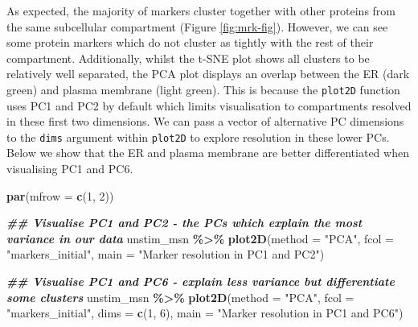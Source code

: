 \documentclass[9pt,a4paper,]{extarticle}
\newenvironment{Shaded}{\begin{snugshade}}{\end{snugshade}}
\newcommand{\AttributeTok}[1]{\textcolor[rgb]{0.13,0.29,0.53}{#1}}
\newcommand{\DecValTok}[1]{\textcolor[rgb]{0.00,0.00,0.81}{#1}}
\newcommand{\DocumentationTok}[1]{\textcolor[rgb]{0.56,0.35,0.01}{\textbf{\textit{#1}}}}
\newcommand{\FunctionTok}[1]{\textcolor[rgb]{0.13,0.29,0.53}{\textbf{#1}}}
\newcommand{\NormalTok}[1]{#1}
\newcommand{\SpecialCharTok}[1]{\textcolor[rgb]{0.81,0.36,0.00}{\textbf{#1}}}
\newcommand{\StringTok}[1]{\textcolor[rgb]{0.31,0.60,0.02}{#1}}
\begin{document}
As expected, the majority of markers cluster together with other proteins from
the same subcellular compartment (Figure \ref{fig:mrk-fig}). However, we can
see some protein markers which do not cluster as tightly with the rest of their
compartment. Additionally, whilst the t-SNE plot shows all clusters to be
relatively well separated, the PCA plot displays an overlap between the ER (dark
green) and plasma membrane (light green). This is because the \texttt{plot2D} function
uses PC1 and PC2 by default which limits visualisation to compartments resolved
in these first two dimensions. We can pass a vector of alternative PC dimensions
to the \texttt{dims} argument within \texttt{plot2D} to explore resolution in these lower PCs.
Below we show that the ER and plasma membrane are better differentiated when
visualising PC1 and PC6.

\begin{Shaded}
\begin{Highlighting}[]
\FunctionTok{par}\NormalTok{(}\AttributeTok{mfrow =} \FunctionTok{c}\NormalTok{(}\DecValTok{1}\NormalTok{, }\DecValTok{2}\NormalTok{))}

\DocumentationTok{\#\# Visualise PC1 and PC2 {-} the PCs which explain the most variance in our data}
\NormalTok{unstim\_msn }\SpecialCharTok{\%\textgreater{}\%}
\FunctionTok{plot2D}\NormalTok{(}\AttributeTok{method =} \StringTok{"PCA"}\NormalTok{, }\AttributeTok{fcol =} \StringTok{"markers\_initial"}\NormalTok{,}
       \AttributeTok{main =} \StringTok{"Marker resolution in PC1 and PC2"}\NormalTok{)}

\DocumentationTok{\#\# Visualise PC1 and PC6 {-} explain less variance but differentiate some clusters}
\NormalTok{unstim\_msn }\SpecialCharTok{\%\textgreater{}\%}
\FunctionTok{plot2D}\NormalTok{(}\AttributeTok{method =} \StringTok{"PCA"}\NormalTok{, }\AttributeTok{fcol =} \StringTok{"markers\_initial"}\NormalTok{,}
       \AttributeTok{dims =} \FunctionTok{c}\NormalTok{(}\DecValTok{1}\NormalTok{, }\DecValTok{6}\NormalTok{), }\AttributeTok{main =} \StringTok{"Marker resolution in PC1 and PC6"}\NormalTok{)}
\end{Highlighting}
\end{Shaded}
\end{document}
